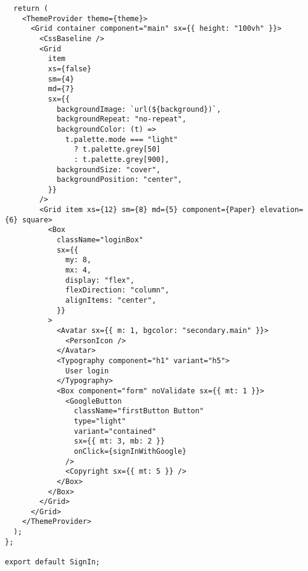 \begin{verbatim}
  return (
    <ThemeProvider theme={theme}>
      <Grid container component="main" sx={{ height: "100vh" }}>
        <CssBaseline />
        <Grid
          item
          xs={false}
          sm={4}
          md={7}
          sx={{
            backgroundImage: `url(${background})`,
            backgroundRepeat: "no-repeat",
            backgroundColor: (t) =>
              t.palette.mode === "light"
                ? t.palette.grey[50]
                : t.palette.grey[900],
            backgroundSize: "cover",
            backgroundPosition: "center",
          }}
        />
        <Grid item xs={12} sm={8} md={5} component={Paper} elevation={6} square>
          <Box
            className="loginBox"
            sx={{
              my: 8,
              mx: 4,
              display: "flex",
              flexDirection: "column",
              alignItems: "center",
            }}
          >
            <Avatar sx={{ m: 1, bgcolor: "secondary.main" }}>
              <PersonIcon />
            </Avatar>
            <Typography component="h1" variant="h5">
              User login
            </Typography>
            <Box component="form" noValidate sx={{ mt: 1 }}>
              <GoogleButton
                className="firstButton Button"
                type="light"
                variant="contained"
                sx={{ mt: 3, mb: 2 }}
                onClick={signInWithGoogle}
              />
              <Copyright sx={{ mt: 5 }} />
            </Box>
          </Box>
        </Grid>
      </Grid>
    </ThemeProvider>
  );
};

export default SignIn;

\end{verbatim}